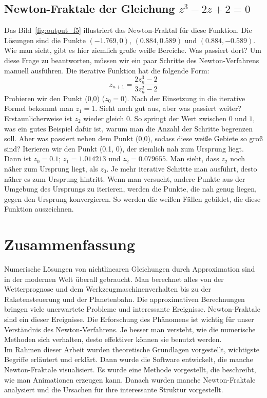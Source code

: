 \documentclass[a4paper,12pt]{llncs}
\numberwithin{equation}{section}
\begin{document}
\subsection{Newton-Fraktale der Gleichung $z^3 - 2z + 2 = 0$}
Das Bild~\ref{fig:output_f5} illustriert das Newton-Fraktal für diese Funktion.
Die Lösungen sind die Punkte $(-1.769,0)$, $(0.884,0.589)$ und $(0.884,-0.589)$.
Wie man sieht, gibt es hier ziemlich große weiße Bereiche. 
Was passiert dort?
Um diese Frage zu beantworten, müssen wir ein paar Schritte des Newton-Verfahrens manuell ausführen.
Die iterative Funktion hat die folgende Form:
\[
z_{n+1} = \frac{2z_n^3-2}{3z_n^2-2}
\]
Probieren wir den Punkt (0,0) ($z_0 = 0$).
Nach der Einsetzung in die iterative Formel bekommt man $z_1 = 1$.
Sieht noch gut aus, aber was passiert weiter?
Erstaunlicherweise ist $z_2$ wieder gleich $0$.
So springt der Wert zwischen $0$ und $1$, was ein gutes Beispiel dafür ist, warum man die Anzahl der Schritte begrenzen soll.
Aber was passiert neben dem Punkt (0,0), sodass diese weiße Gebiete so groß sind?
Iterieren wir den Punkt (0.1, 0), der ziemlich nah zum Ursprung liegt.
Dann ist $z_0=0.1$; $z_1= 1.014213$ und $z_2= 0.079655$.
Man sieht, dass $z_2$ noch näher zum Ursprung liegt, als $z_0$.
Je mehr iterative Schritte man ausführt, desto näher es zum Ursprung hintritt.
Wenn man versucht, andere Punkte aus der Umgebung des Ursprungs zu iterieren, werden die Punkte, die nah genug liegen, gegen den Ursprung konvergieren.
So werden die weißen Fällen gebildet, die diese Funktion auszeichnen.

\section{Zusammenfassung}
Numerische Lösungen von nichtlinearen Gleichungen durch Approximation sind in der modernen Welt überall gebraucht.
Man berechnet alles von der Wetterprognose und dem Werkzeugmaschinenverhalten bis zu der Raketensteuerung und der Planetenbahn.
Die approximativen Berechnungen bringen viele unerwartete Probleme und interessante Ereignisse.
Newton-Fraktale sind ein dieser Ereignisse. 
Die Erforschung des Phänomens ist wichtig für unser Verständnis des Newton-Verfahrens. 
Je besser man versteht, wie die numerische Methoden sich verhalten, desto effektiver können sie benutzt werden.\\
Im Rahmen dieser Arbeit wurden theoretische Grundlagen vorgestellt, wichtigste Begriffe erläutert und erklärt.
Dann wurde die Software entwickelt, die manche Newton-Fraktale visualisiert.
Es wurde eine Methode vorgestellt, die beschreibt, wie man Animationen erzeugen kann.
Danach wurden manche Newton-Fraktale analysiert und die Ursachen für ihre interessante Struktur vorgestellt.
\newpage

 

\end{document}
